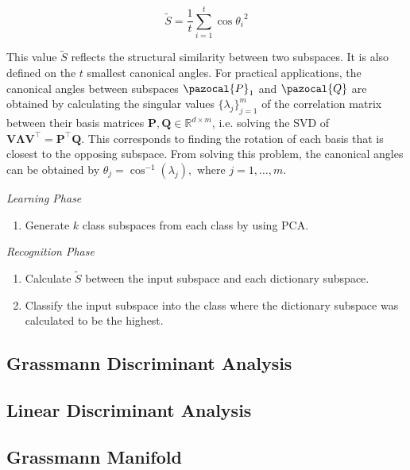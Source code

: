 \[    \tilde{S} = \frac{1}{t} \sum^{t}_{i=1}\cos{\theta_i}^2 \]

This value $\tilde{S}$ reflects the structural similarity between two subspaces. It is also defined on the $t$ smallest canonical angles. For practical applications, the canonical angles between subspaces $\pazocal{P}_1$ and $\pazocal{Q}$ are obtained by calculating the singular values $\{\lambda_j\}_{j=1}^{m}$ of the correlation matrix between their basis matrices $\bm{P}, \bm{Q} \in \mathbb{R}^{d{\times}m}$, i.e. solving the SVD of $\bm{V}\bm{\Lambda}\bm{V}^{\top} = \bm{P}^{\top}\bm{Q}$. This corresponds to finding the rotation of each basis that is closest to the opposing subspace. From solving this problem, the canonical angles can be obtained by $\theta_j = \cos^{-1}(\lambda_j), \text{ where } j = 1, \ldots, m$.

{\setlength{\parindent}{0cm} \vspace{5mm}

\emph{Learning Phase}

\begin{enumerate}
    \item Generate $k$ class subspaces from each class by using PCA.
\end{enumerate}

\emph{Recognition Phase}

\begin{enumerate}
    \item Calculate $\tilde{S}$ between the input subspace and each dictionary subspace.
    \item Classify the input subspace into the class where the dictionary subspace was calculated to be the highest.
\end{enumerate}
}
\newpage

\subsection{Grassmann Discriminant Analysis}

\subsection{Linear Discriminant Analysis}

\subsection{Grassmann Manifold}

